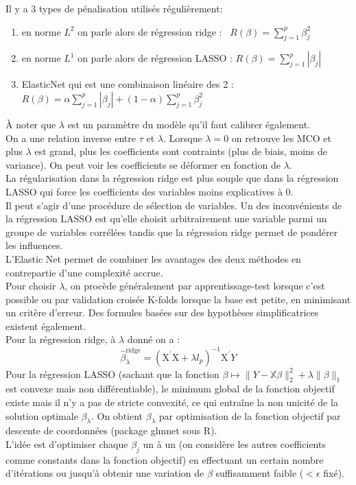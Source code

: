 \documentclass[french]{article}
\begin{document}
\begin{multicols}{2}
\noindent Il y a 3 types de pénalisation utilisés régulièrement: 
\begin{enumerate}
    \item en norme $L^{2}$ on parle alors de régression ridge  : \ $R(\beta)=\sum_{j=1}^{p}\beta_{j}^{2}$
    \item en norme $L^{1}$ on parle alors de régression LASSO  : $R(\beta)=\sum_{j=1}^{p}\left|\beta_{j}\right|$
    \item ElasticNet qui est une combinaison linéaire des 2 : $R(\beta)=\alpha \sum_{j=1}^{p}\left|\beta_{j}\right|+(1-\alpha) \sum_{j=1}^{p} \beta_{j}^{2}$
\end{enumerate}

À noter que $\lambda$ est un paramètre du modèle qu'il faut calibrer également.\\
On a une relation inverse entre $\tau$ et $\lambda$. Lorsque $\lambda=0$ on retrouve les MCO et plus $\lambda$ est grand, plus les coefficients sont contraints (plus de biais, moins de variance).
On peut voir les coefficients se déformer en fonction de $\lambda$.\\
La régularisation dans la régression ridge est plus souple que dans la régression LASSO qui force les coefficients des variables moins explicatives à 0.\\ Il peut s'agir d'une procédure de sélection de variables.
Un des inconvénients de la régression LASSO est qu'elle choisit arbitrairement une variable parmi un groupe de variables corrélées tandis que la régression ridge permet de pondérer les influences.\\
L'Elastic Net permet de combiner les avantages des deux méthodes en contrepartie d'une complexité accrue.\\

Pour choisir $\lambda$, on procède généralement par apprentissage-test lorsque c'est possible ou par validation croisée K-folds lorsque la base est petite, en minimisant un critère d'erreur. Des formules basées sur des hypothèses simplificatrices existent également.\\

\noindent Pour la régression ridge, à $\lambda$ donné on a : $$ \hat{\beta}_{\lambda}^{\text {ridge}}=\left(\mathrm{X}^{\prime} \mathrm{X}+\lambda l_{p}\right)^{-1} \mathrm{X}^{\prime} Y$$
Pour la régression LASSO (sachant que la fonction $\beta \mapsto\|Y-\mathbb{X} \beta\|_{2}^{2}+\lambda\|\beta\|_{1}$ est convexe mais non différentiable), le minimum global de la fonction objectif existe mais il n'y a pas de stricte convexité, ce qui entraîne la non unicité de la solution optimale $\beta_{\lambda}$.
On obtient $\beta_{\lambda}$ par optimisation de la fonction objectif par descente de coordonnées (package glmnet sous R).\\
L'idée est d'optimiser chaque $\beta_j$ un à un \cite{fromont} (on considère les autres coefficients comme constants dans la fonction objectif) en effectuant un certain nombre d'itérations ou jusqu'à obtenir une variation de $\beta$ suffisamment faible ($ <\epsilon $ fixé).


\end{multicols}
\end{document}

